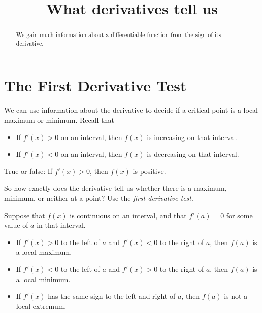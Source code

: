 \documentclass{ximera}
\title{What derivatives tell us}
\begin{document}
\begin{abstract}
  We gain much information about a differentiable function from the
  sign of its derivative.
\end{abstract}
\maketitle


\section*{The First Derivative Test}

We can use information about the derivative to decide if a critical
point is a local maximum or minimum. Recall that

\begin{itemize}
\item If $f'(x) >0$ on an interval, then $f(x)$ is increasing on that interval.
\item If $f'(x) <0$ on an interval, then $f(x)$ is decreasing on that interval.
\end{itemize}

\begin{question}
True or false: If $f'(x)>0$, then $f(x)$ is positive. 
    \begin{multipleChoice}
    \end{multipleChoice}  
\end{question}


So how exactly does the derivative tell us whether there is a maximum,
minimum, or neither at a point? Use the \textit{first derivative test}.

\begin{theorem}
Suppose that $f(x)$ is continuous on an interval, and that $f'(a)=0$
for some value of $a$ in that interval.
\begin{itemize}
\item If $f'(x)>0$ to the left of $a$ and $f'(x)<0$ to the right of
  $a$, then $f(a)$ is a local maximum.
\item If $f'(x)<0$ to the left of $a$ and $f'(x)>0$ to the right of
  $a$, then $f(a)$ is a local minimum.
\item If $f'(x)$ has the same sign to the left and right of $a$,
  then $f(a)$ is not a local extremum.
\end{itemize}
\end{theorem}
\end{document}
